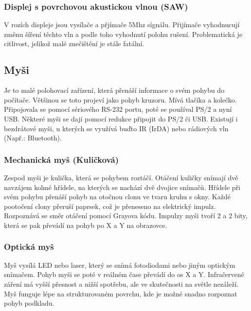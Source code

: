 \subsubsection{Displej s povrchovou akustickou vlnou (SAW)}
V rozích displeje jsou vysílače a přjímače 5Mhz sígnálu.
Přijímače vyhodnucují změnu šíření těchto vln a podle toho vyhodnutí polohu rušení.
Problematická je citlivost, jelikož malé znečištění je stále fatální.
\subsection{Myši}
Je to malé polohovací zařízení, která přenáší informace o svém pohybu do počítače.
Většinou se toto projeví jako pohyb kruzoru.
Mívá tlačíka a kolečko.
Připojovala se pomocí sériového RS-232 portu, poté se používal PS/2 a nyní USB.
Některé myši se dají pomocí redukce připojit do PS/2 či USB.
Existují i bezdrátové myši, u kterých se využívá buďto IR (IrDA) nebo rádiových vln (Např.: Bluetooth).
\subsubsection{Mechanická myš (Kuličková)}
Zespod myši je kulička, která se pohybem roztáčí.
Otáčení kuličky snímají dvě navzájem kolmé hřídele, na kterých se nachází dvě dvojice snímačů.
Hřídele při svém pohybu přenáší pohyb na otočnou clonu ve tvaru kruhu s okny.
Každé pootočení clony přeruší paprsek, což je přeneseno na elektrický impulz.
Rozpoznává se směr otáčení pomocí Grayova kódu.
Impulzy myši tvoří 2 a 2 bity, která se pak převádí na pohyb po X a Y na obrazovce.
\subsubsection{Optická myš}
Myš vysílá LED nebo laser, který se snímá fotodiodami nebo jiným optickým snímačem.
Pohyb myši se poté v reálném čase převádí do os X a Y.
Infračervené záření má vyšší přesnost a nižší spotřebu, ale ve skutečnosti na světle nezáleží.
Myš funguje lépe na strukturovaném povrchu, kde je možné snadno rozpoznat pohyb podkladu.